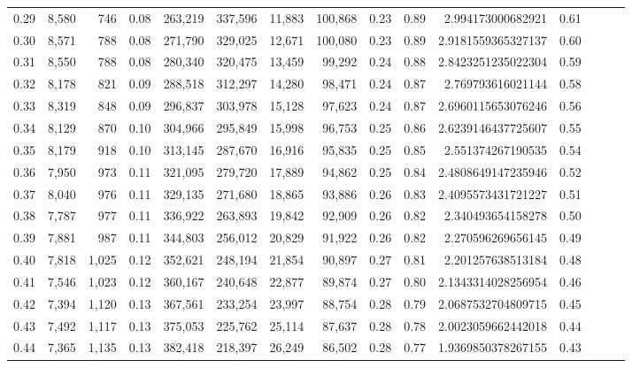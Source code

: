 \begin{tabular}{rrrrrrrrrrrrrrr}
0.29 &   8,580 &    746 &  0.08 &  263,219 &  337,596 &   11,883 &  100,868 &  0.23 &  0.89 &     2.994173000682921 &      0.61 \\
0.30 &   8,571 &    788 &  0.08 &  271,790 &  329,025 &   12,671 &  100,080 &  0.23 &  0.89 &    2.9181559365327137 &      0.60 \\
0.31 &   8,550 &    788 &  0.08 &  280,340 &  320,475 &   13,459 &   99,292 &  0.24 &  0.88 &    2.8423251235022304 &      0.59 \\
0.32 &   8,178 &    821 &  0.09 &  288,518 &  312,297 &   14,280 &   98,471 &  0.24 &  0.87 &     2.769793616021144 &      0.58 \\
0.33 &   8,319 &    848 &  0.09 &  296,837 &  303,978 &   15,128 &   97,623 &  0.24 &  0.87 &    2.6960115653076246 &      0.56 \\
0.34 &   8,129 &    870 &  0.10 &  304,966 &  295,849 &   15,998 &   96,753 &  0.25 &  0.86 &    2.6239146437725607 &      0.55 \\
0.35 &   8,179 &    918 &  0.10 &  313,145 &  287,670 &   16,916 &   95,835 &  0.25 &  0.85 &     2.551374267190535 &      0.54 \\
0.36 &   7,950 &    973 &  0.11 &  321,095 &  279,720 &   17,889 &   94,862 &  0.25 &  0.84 &    2.4808649147235946 &      0.52 \\
0.37 &   8,040 &    976 &  0.11 &  329,135 &  271,680 &   18,865 &   93,886 &  0.26 &  0.83 &    2.4095573431721227 &      0.51 \\
0.38 &   7,787 &    977 &  0.11 &  336,922 &  263,893 &   19,842 &   92,909 &  0.26 &  0.82 &     2.340493654158278 &      0.50 \\
0.39 &   7,881 &    987 &  0.11 &  344,803 &  256,012 &   20,829 &   91,922 &  0.26 &  0.82 &     2.270596269656145 &      0.49 \\
0.40 &   7,818 &  1,025 &  0.12 &  352,621 &  248,194 &   21,854 &   90,897 &  0.27 &  0.81 &     2.201257638513184 &      0.48 \\
0.41 &   7,546 &  1,023 &  0.12 &  360,167 &  240,648 &   22,877 &   89,874 &  0.27 &  0.80 &    2.1343314028256954 &      0.46 \\
0.42 &   7,394 &  1,120 &  0.13 &  367,561 &  233,254 &   23,997 &   88,754 &  0.28 &  0.79 &    2.0687532704809715 &      0.45 \\
0.43 &   7,492 &  1,117 &  0.13 &  375,053 &  225,762 &   25,114 &   87,637 &  0.28 &  0.78 &    2.0023059662442018 &      0.44 \\
0.44 &   7,365 &  1,135 &  0.13 &  382,418 &  218,397 &   26,249 &   86,502 &  0.28 &  0.77 &    1.9369850378267155 &      0.43 \\

\end{tabular}
